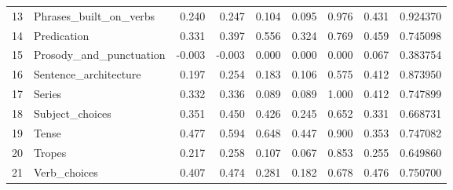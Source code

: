 \begin{tabular}{llrrrrrrr}
13 &       Phrases\_built\_on\_verbs &              0.240 &                0.247 &    0.104 &  0.095 &       0.976 &         0.431 &    0.924370 \\
14 &                  Predication &              0.331 &                0.397 &    0.556 &  0.324 &       0.769 &         0.459 &    0.745098 \\
15 &      Prosody\_and\_punctuation &             -0.003 &               -0.003 &    0.000 &  0.000 &       0.000 &         0.067 &    0.383754 \\
16 &        Sentence\_architecture &              0.197 &                0.254 &    0.183 &  0.106 &       0.575 &         0.412 &    0.873950 \\
17 &                       Series &              0.332 &                0.336 &    0.089 &  0.089 &       1.000 &         0.412 &    0.747899 \\
18 &              Subject\_choices &              0.351 &                0.450 &    0.426 &  0.245 &       0.652 &         0.331 &    0.668731 \\
19 &                        Tense &              0.477 &                0.594 &    0.648 &  0.447 &       0.900 &         0.353 &    0.747082 \\
20 &                       Tropes &              0.217 &                0.258 &    0.107 &  0.067 &       0.853 &         0.255 &    0.649860 \\
21 &                 Verb\_choices &              0.407 &                0.474 &    0.281 &  0.182 &       0.678 &         0.476 &    0.750700 \\
\bottomrule
\end{tabular}
